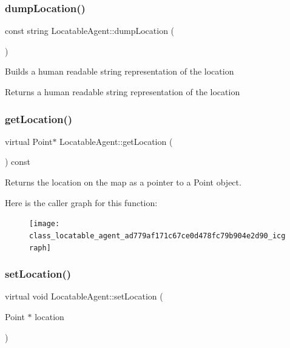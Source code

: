 \subsubsection{\texorpdfstring{dump\+Location()}{dumpLocation()}}
{\footnotesize\ttfamily const string Locatable\+Agent\+::dump\+Location (\begin{DoxyParamCaption}{ }\end{DoxyParamCaption})}

Builds a human readable string representation of the location \begin{DoxyReturn}{Returns}
a human readable string representation of the location 
\end{DoxyReturn}
\mbox{\label{class_locatable_agent_ad779af171c67ce0d478fc79b904e2d90}} 
\subsubsection{\texorpdfstring{get\+Location()}{getLocation()}}
{\footnotesize\ttfamily virtual Point$\ast$ Locatable\+Agent\+::get\+Location (\begin{DoxyParamCaption}{ }\end{DoxyParamCaption}) const\hspace{0.3cm}{\ttfamily [virtual]}}

\begin{DoxyReturn}{Returns}
the location on the map as a pointer to a Point object. 
\end{DoxyReturn}
Here is the caller graph for this function\+:\nopagebreak
\begin{figure}[H]
\begin{center}
\leavevmode
\texttt{[image: class\_locatable\_agent\_ad779af171c67ce0d478fc79b904e2d90\_icgraph]}
\end{center}
\end{figure}
\mbox{\label{class_locatable_agent_a754b237c404b77714fedd397f214bc02}} 
\subsubsection{\texorpdfstring{set\+Location()}{setLocation()}}
{\footnotesize\ttfamily virtual void Locatable\+Agent\+::set\+Location (\begin{DoxyParamCaption}\item[{Point $\ast$}]{location }\end{DoxyParamCaption})\hspace{0.3cm}{\ttfamily [virtual]}}

